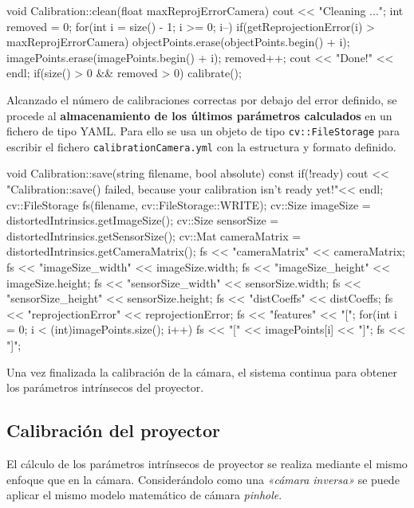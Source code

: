 \begin{itemize}
\begin{listing}[
  float=ht,
  language = C++,
  caption  = {Limpieza de calibraciones},
  label    = code:clean]  
void Calibration::clean(float maxReprojErrorCamera) {
  cout << "Cleaning ...";
   int removed = 0;
   for(int i = size() - 1; i >= 0; i--) {
     if(getReprojectionError(i) > maxReprojErrorCamera) {
       objectPoints.erase(objectPoints.begin() + i);
       imagePoints.erase(imagePoints.begin() + i);
       removed++;
     }
   }
   cout << "Done!" << endl;
   if(size() > 0 && removed > 0) 
   calibrate();
}
\end{listing}
 


\end{itemize}
      
Alcanzado el número de calibraciones correctas por debajo del error definido, se procede al \textbf{almacenamiento de los últimos parámetros calculados} en un fichero de tipo YAML. Para ello se usa un objeto de tipo \texttt{cv::FileStorage} para escribir el fichero \texttt{calibrationCamera.yml} con la estructura y formato definido.

\begin{listing}[
  float=ht,
  language = C++,
  caption  = {Almacenamiento de los parámetros intrínsecos en un fichero YAML},
  label    = code:FileStorage]
  void Calibration::save(string filename, bool absolute) const {
    if(!ready){
      cout << "Calibration::save() failed, because your calibration isn't ready yet!"<< endl;
    }
    cv::FileStorage fs(filename, cv::FileStorage::WRITE);
    cv::Size imageSize = distortedIntrinsics.getImageSize();
    cv::Size sensorSize = distortedIntrinsics.getSensorSize();
    cv::Mat cameraMatrix = distortedIntrinsics.getCameraMatrix();
    fs << "cameraMatrix" << cameraMatrix;
    fs << "imageSize_width" << imageSize.width;
    fs << "imageSize_height" << imageSize.height;
    fs << "sensorSize_width" << sensorSize.width;
    fs << "sensorSize_height" << sensorSize.height;
    fs << "distCoeffs" << distCoeffs;
    fs << "reprojectionError" << reprojectionError;
    fs << "features" << "[";
    for(int i = 0; i < (int)imagePoints.size(); i++) {
      fs << "[" << imagePoints[i] << "]";
    }
    fs << "]";
  }
\end{listing}

Una vez finalizada la calibración de la cámara, el sistema continua para obtener los parámetros intrínsecos del proyector.

\subsection{Calibración del proyector}
El cálculo de los parámetros intrínsecos de proyector se realiza mediante el mismo enfoque que en la cámara. Considerándolo como una \textit{«cámara inversa»} se puede aplicar el mismo modelo matemático de cámara \emph{pinhole}.

